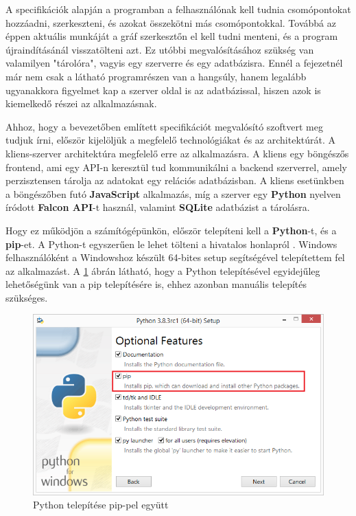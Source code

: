 

A specifikációk alapján a programban a felhasználónak kell tudnia csomópontokat hozzáadni, szerkeszteni, és azokat összekötni más csomópontokkal. Továbbá az éppen aktuális munkáját a gráf szerkesztőn el kell tudni menteni, és a program újraindításánál visszatölteni azt. Ez utóbbi megvalósításához szükség van valamilyen "tárolóra", vagyis egy szerverre és egy adatbázisra. Ennél a fejezetnél már nem csak a látható programrészen van a hangsúly, hanem legalább ugyanakkora figyelmet kap a szerver oldal is az adatbázissal, hiszen azok is kiemelkedő részei az alkalmazásnak.


Ahhoz, hogy a bevezetőben említett specifikációt megvalósító szoftvert meg tudjuk írni, először kijelöljük a megfelelő technológiákat és az architektúrát. A kliens-szerver architektúra megfelelő erre az alkalmazásra. A kliens egy böngészős frontend, ami egy API-n keresztül tud kommunikálni a backend szerverrel, amely perzisztensen tárolja az adatokat egy relációs adatbázisban. A kliens esetünkben a böngészőben futó \textbf{JavaScript} alkalmazás, míg a szerver egy \textbf{Python} nyelven íródott \textbf{Falcon API}-t használ, valamint \textbf{SQLite} adatbázist a tárolásra.
 
Hogy ez működjön a számítógépünkön, először telepíteni kell a \textbf{Python}-t, és a \textbf{pip}-et. A Python-t egyszerűen le lehet tölteni a hivatalos honlapról \cite{pyt}. Windows felhasználóként a Windowshoz készült 64-bites setup segítségével telepítettem fel az alkalmazást. A \ref{fig:pyt1} ábrán látható, hogy a Python telepítésével egyidejűleg lehetőségünk van a pip telepítésére is, ehhez azonban manuális telepítés szükséges.

\begin{figure}[h]
\centering
\includegraphics[scale=0.7]{images/python1.png}
\caption{Python telepítése pip-pel együtt}
\label{fig:pyt1}
\end{figure}

